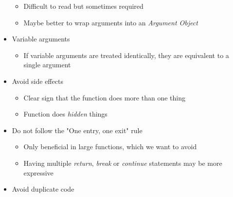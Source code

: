 \begin{itemize}
\begin{itemize}
        \item Difficult to read but sometimes required
        \item Maybe better to wrap arguments into an \textit{Argument Object}
    \end{itemize}
    \item Variable arguments
    \begin{itemize}
        \item If variable arguments are treated identically, they are equivalent to a single argument
    \end{itemize}
    \item Avoid side effects
    \begin{itemize}
        \item Clear sign that the function does more than one thing
        \item Function does \textit{hidden} things
    \end{itemize}
    \item Do not follow the "One entry, one exit" rule
    \begin{itemize}
        \item Only beneficial in large functions, which we want to avoid
        \item Having multiple \textit{return}, \textit{break} or \textit{continue} statements may be more expressive
    \end{itemize}
    \item Avoid duplicate code
\end{itemize}